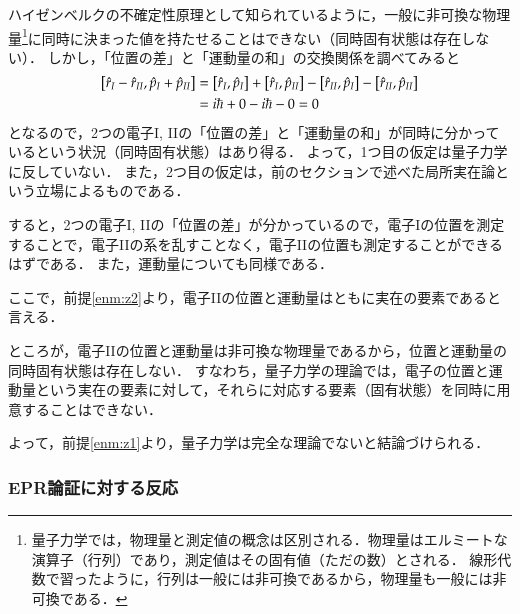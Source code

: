 \documentclass[10pt,b5paper,papersize,dvipdfmx]{jsbook}
\begin{document}
ハイゼンベルクの不確定性原理として知られているように，一般に非可換な物理量\footnote{
  量子力学では，物理量と測定値の概念は区別される．物理量はエルミートな演算子（行列）であり，測定値はその固有値（ただの数）とされる．
  線形代数で習ったように，行列は一般には非可換であるから，物理量も一般には非可換である．
}に同時に決まった値を持たせることはできない（同時固有状態は存在しない）．
しかし，「位置の差」と「運動量の和」の交換関係を調べてみると
\begin{align*}
  \comm{\hat r_I - \hat r_{II}}{\hat p_I + \hat p_{II}}
  &= \comm{\hat r_I}{\hat p_I} + \comm{\hat r_I}{\hat p_{II}} - \comm{\hat r_{II}}{\hat p_I} - \comm{\hat r_{II}}{\hat p_{II}} \\
  &= i\hbar + 0 - i\hbar - 0
  = 0
\end{align*}
となるので，2つの電子I, IIの「位置の差」と「運動量の和」が同時に分かっているという状況（同時固有状態）はあり得る．
よって，1つ目の仮定は量子力学に反していない．
また，2つ目の仮定は，前のセクションで述べた局所実在論という立場によるものである．\par
すると，2つの電子I, IIの「位置の差」が分かっているので，電子Iの位置を測定することで，電子IIの系を乱すことなく，電子IIの位置も測定することができるはずである．
また，運動量についても同様である．\par
ここで，前提\ref{enm:z2}より，電子IIの位置と運動量はともに実在の要素であると言える．\par
ところが，電子IIの位置と運動量は非可換な物理量であるから，位置と運動量の同時固有状態は存在しない．
すなわち，量子力学の理論では，電子の位置と運動量という実在の要素に対して，それらに対応する要素（固有状態）を同時に用意することはできない．\par
よって，前提\ref{enm:z1}より，量子力学は完全な理論でないと結論づけられる．

%
\subsubsection{EPR論証に対する反応} %
\end{document}
